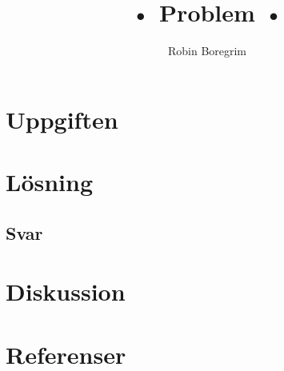 \documentclass[11pt]{article}
\begin{document}
\title{• Problem •}
\author{Robin Boregrim}
\maketitle
\renewcommand{\contentsname}{Innehållsförteckning}
\tableofcontents
\newpage
\section{Uppgiften}
\section{Lösning}
\subsection{Svar}
\section{Diskussion}
\section{Referenser}
\end{document}

